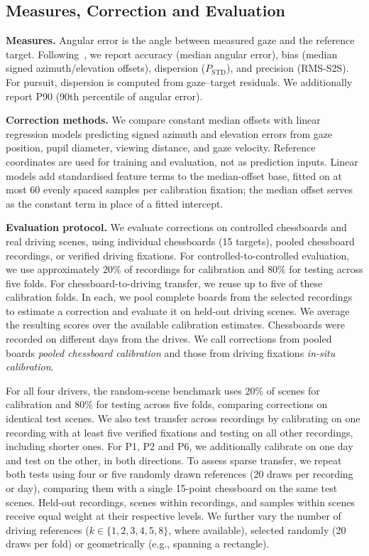 
\subsection{Measures, Correction and Evaluation}
\label{sec:method_analysis}

\textbf{Measures.}
Angular error is the angle between measured gaze and the
reference target. Following~\cite{niehorster2026fundamentals7},
we report accuracy (median angular error), bias (median signed
azimuth/elevation offsets), dispersion ($P_\mathrm{STD}$),
and precision (RMS-S2S). For pursuit, dispersion is computed
from gaze--target residuals. We additionally report P90
(90th percentile of angular error).

\textbf{Correction methods.}
We compare constant median offsets with linear regression models
predicting signed azimuth and elevation errors from gaze
position, pupil diameter, viewing distance, and gaze velocity.
Reference coordinates are used for training and evaluation,
not as prediction inputs.
Linear models add standardised feature terms to the median-offset
base, fitted on at most 60 evenly spaced samples per calibration
fixation; the median offset serves as the constant term in place
of a fitted intercept.

\textbf{Evaluation protocol.}
We evaluate corrections on controlled chessboards and real
driving scenes, using individual chessboards (15 targets),
pooled chessboard recordings, or verified driving fixations.
For controlled-to-controlled evaluation, we use approximately
20\% of recordings for calibration and 80\% for testing
across five folds.
For chessboard-to-driving transfer, we reuse up to five of these
calibration folds. In each, we pool complete boards from the
selected recordings to estimate a correction and evaluate it
on held-out driving scenes. We average the resulting scores over the available
calibration estimates. Chessboards were recorded on different days from
the drives. We call corrections from pooled boards \emph{pooled chessboard
calibration} and those from driving fixations
\emph{in-situ calibration}.

For all four drivers, the random-scene benchmark uses
20\% of scenes for calibration and 80\% for testing across
five folds, comparing corrections on identical test scenes.
We also test transfer across recordings by calibrating on
one recording with at least five verified fixations and testing
on all other recordings, including shorter ones. For P1, P2
and P6, we additionally calibrate on one day and test on the
other, in both directions. To assess sparse transfer, we repeat both tests
using four or five randomly drawn references (20 draws per recording or day), comparing them with a single 15-point chessboard
on the same test scenes. Held-out recordings, scenes within
recordings, and samples within scenes receive equal weight
at their respective levels. We further vary the number of
driving references ($k\in\{1,2,3,4,5,8\}$, where available),
selected randomly (20 draws per fold) or geometrically
(e.g., spanning a rectangle).

